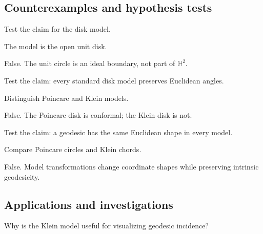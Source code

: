 \subsection*{Counterexamples and hypothesis tests}

\begin{exercise}\label{exr:vii31-ped-10}
Test the claim for the disk model.
\end{exercise}

\begin{hint}
The model is the open unit disk.
\end{hint}

\begin{solution}
False.  The unit circle is an ideal boundary, not part of \(\mathbb H^2\).
\end{solution}

\begin{exercise}\label{exr:vii31-ped-11}
Test the claim: every standard disk model preserves Euclidean angles.
\end{exercise}

\begin{hint}
Distinguish Poincare and Klein models.
\end{hint}

\begin{solution}
False.  The Poincare disk is conformal; the Klein disk is not.
\end{solution}

\begin{exercise}\label{exr:vii31-ped-12}
Test the claim: a geodesic has the same Euclidean shape in every model.
\end{exercise}

\begin{hint}
Compare Poincare circles and Klein chords.
\end{hint}

\begin{solution}
False.  Model transformations change coordinate shapes while preserving intrinsic geodesicity.
\end{solution}

\subsection*{Applications and investigations}

\begin{exercise}[Visualization]\label{exr:vii31-ped-13}
Why is the Klein model useful for visualizing geodesic incidence?
\end{exercise}


